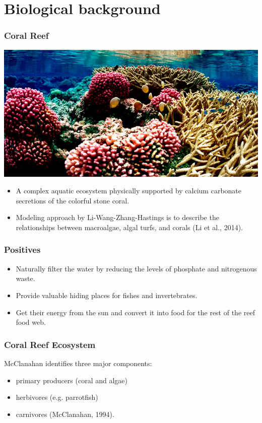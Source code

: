 
\section{Biological background}

\begin{frame}
\frametitle{Coral Reef}
\includegraphics[scale=.175]{./US-Wildlife-coral-1.jpg}
\begin{itemize}
\item A complex aquatic ecosystem physically supported by calcium carbonate secretions of the colorful stone coral. \\
\item Modeling approach by Li-Wang-Zhang-Hastings is to describe the relationships between macroalgae, algal turfs, and corals (Li et al., 2014).
\end{itemize}
\end{frame}

\begin{frame}
\frametitle{Positives}
\begin{itemize}
\item Naturally filter the water by reducing the levels of phosphate and nitrogenous waste.
\item Provide valuable hiding places for fishes and invertebrates.
\item Get their energy from the sun and convert it into food for the rest of the reef food web. 
\end{itemize}
\end{frame}

\begin{frame}
\frametitle{Coral Reef Ecosystem} 

McClanahan identifies three major components:
\begin{itemize}
\item primary producers (coral and algae)\\
\item herbivores (e.g. parrotfish)\\
\item carnivores (McClanahan, 1994).
\end{itemize}
\end{frame}

